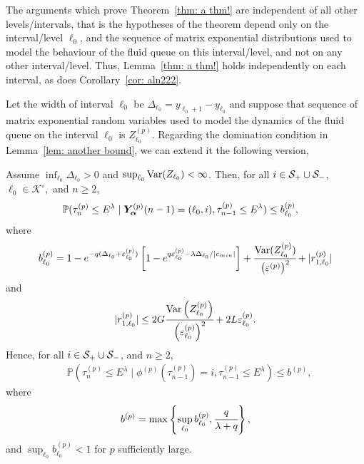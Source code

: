The arguments which prove Theorem~\ref{thm: a thm!} are independent of all other levels/intervals, that is the hypotheses of the theorem depend only on the interval/level \({\ell_0}\), and the sequence of matrix exponential distributions used to model the behaviour of the fluid queue on this interval/level, and not on any other interval/level. Thus, Lemma~\ref{thm: a thm!} holds independently on each interval, as does Corollary~\ref{cor: aln222}.

Let the width of interval \({\ell_0}\) be \(\Delta_{\ell_0}=y_{\ell_0+1}-y_{\ell_0}\) and suppose that sequence of matrix exponential random variables used to model the dynamics of the fluid queue on the interval \({\ell_0}\) is \(Z_{\ell_0}^{(p)}\). Regarding the domination condition in Lemma~\ref{lem: another bound}, we can extend it the following version, 
\begin{lem}\label{lem: another bound sdfg}
	Assume \(\inf_{\ell_0}\Delta_{\ell_0}>0\) and \(\sup_{\ell_0}\mathrm{Var}(Z_{\ell_0})<\infty\). Then, for all \(i\in\mathcal S_+\cup \mathcal{S}_-\), \(\ell_0\in\mathcal K^\circ,\) and \(n\geq 2\), 
	\begin{align}
		&\mathbb P(\tau_n^{(p)}\leq E^\lambda \mid \bm{Y}_{\bm{\alpha}}^{(p)}(n-1) = (\ell_0,i), \tau_{n-1}^{(p)}\leq  E^\lambda ) \leq b_{\ell_0}^{(p)},\label{eqn: ell0 version}
	\end{align}
	where 
	\[b_{\ell_0}^{(p)} = 1-e^{-q(\Delta_{\ell_0}+\varepsilon_{\ell_0}^{(p)})}\left[1-e^{q\varepsilon_{\ell_0}^{(p)}-\lambda \Delta_{\ell_0}/|c_{min}|}\right] + \cfrac{\mathrm{Var}(Z_{\ell_0}^{(p)})}{\left(\varepsilon^{(p)}\right)^2} + |r_{1,\ell_0}^{(p)}| \]
	and  
	\[|r_{1,\ell_0}^{(p)}|\leq 2G\cfrac{\mathrm{Var} \left(Z_{\ell_0}^{(p)}\right)}{\left(\varepsilon_{\ell_0}^{(p)}\right)^2} + 2L\varepsilon_{\ell_0}^{(p)}.\]
	Hence, for all \(i\in\mathcal S_+\cup \mathcal{S}_-\), and \(n\geq 2\), 
	\begin{align}
		&\mathbb P(\tau_n^{(p)}\leq E^\lambda \mid \phi^{(p)}(\tau_{n-1}^{(p)})=i, \tau_{n-1}^{(p)}\leq  E^\lambda ) \leq b^{(p)}, \label{eqn: skjhg}
	\end{align}
	where 
	\[b^{(p)} = \max\left\{\sup_{\ell_0}b_{\ell_0}^{(p)}, \cfrac{q}{\lambda + q}\right\},\]
	and \(\sup_{\ell_0}b_{\ell_0}^{(p)}<1\) for \(p\) sufficiently large.
\end{lem}
